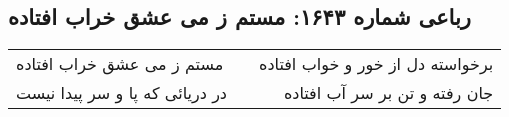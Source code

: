 \begin{center}
\section*{رباعی شماره ۱۶۴۳: مستم ز می عشق خراب افتاده}
\label{sec:1643}
\begin{longtable}{l p{0.5cm} r}
مستم ز می عشق خراب افتاده
&&
برخواسته دل از خور و خواب افتاده
\\
در دریائی که پا و سر پیدا نیست
&&
جان رفته و تن بر سر آب افتاده
\\
\end{longtable}
\end{center}
